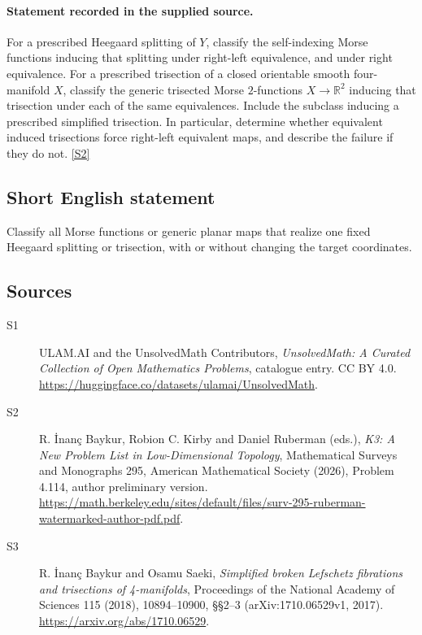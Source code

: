 \documentclass[11pt]{article}
\newcommand{\sref}[2]{\hyperlink{source:#1:#2}{[S#2]}}
\begin{document}
\paragraph{Statement recorded in the supplied source.}
For a prescribed Heegaard splitting of $Y$, classify the self-indexing Morse functions inducing that splitting under right-left equivalence, and under right equivalence. For a prescribed trisection of a closed orientable smooth four-manifold $X$, classify the generic trisected Morse $2$-functions $X\to\mathbb R^2$ inducing that trisection under each of the same equivalences. Include the subclass inducing a prescribed simplified trisection. In particular, determine whether equivalent induced trisections force right-left equivalent maps, and describe the failure if they do not. \sref{statement}{2}
\subsection{Short English statement}
Classify all Morse functions or generic planar maps that realize one fixed Heegaard splitting or trisection, with or without changing the target coordinates.
\subsection{Sources}
\begin{description}
\item[\hypertarget{source:statement:1}{S1}] ULAM.AI and the UnsolvedMath Contributors, \emph{UnsolvedMath: A Curated Collection of Open Mathematics Problems}, catalogue entry. CC BY 4.0. \url{https://huggingface.co/datasets/ulamai/UnsolvedMath}.
\item[\hypertarget{source:statement:2}{S2}] R. İnanç Baykur, Robion C. Kirby and Daniel Ruberman (eds.), \emph{K3: A New Problem List in Low-Dimensional Topology}, Mathematical Surveys and Monographs 295, American Mathematical Society (2026), Problem 4.114, author preliminary version. \url{https://math.berkeley.edu/sites/default/files/surv-295-ruberman-watermarked-author-pdf.pdf}.
\item[\hypertarget{source:statement:3}{S3}] R. İnanç Baykur and Osamu Saeki, \emph{Simplified broken Lefschetz fibrations and trisections of 4-manifolds}, Proceedings of the National Academy of Sciences 115 (2018), 10894--10900, §§2--3 (arXiv:1710.06529v1, 2017). \url{https://arxiv.org/abs/1710.06529}.
\end{description}
\label{end:statement}
\end{document}
